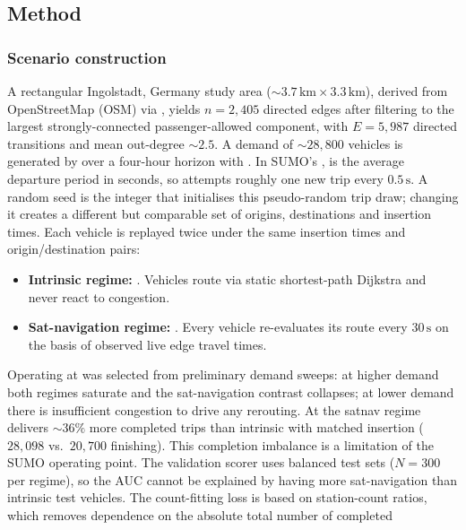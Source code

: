 \subsection{Method}

\subsubsection{Scenario construction}\label{sec:phase4-scenario}

A rectangular Ingolstadt, Germany study area
($\sim 3.7\,\text{km} \times 3.3\,\text{km}$), derived from
OpenStreetMap (OSM) via , yields $n = 2{,}405$ directed edges after filtering
to the largest strongly-connected passenger-allowed component, with
$E = 5{,}987$ directed transitions and mean out-degree $\sim 2.5$. A
demand of $\sim 28{,}800$ vehicles is generated by
 over a four-hour horizon with . In
SUMO's ,  is the average departure period in
seconds, so  attempts roughly one new trip every
$0.5\,\mathrm{s}$. A random seed is the integer that initialises this
pseudo-random trip draw; changing it creates a different but comparable
set of origins, destinations and insertion times. Each vehicle is replayed twice
under the same insertion times and origin/destination pairs:
\begin{itemize}
\item \textbf{Intrinsic regime:} .
Vehicles route via static shortest-path Dijkstra and never react to
congestion.
\item \textbf{Sat-navigation regime:} .
Every vehicle re-evaluates its route every $30\,\mathrm{s}$ on the basis
of observed live edge travel times.
\end{itemize}
Operating at  was selected from preliminary demand sweeps:
at higher demand both regimes saturate and
the sat-navigation contrast collapses; at lower demand there is
insufficient congestion to drive any rerouting. At  the
satnav regime delivers $\sim 36\%$ more completed trips than intrinsic
with matched insertion ($28{,}098$ vs.\ $20{,}700$ finishing). This
completion imbalance is a limitation of the SUMO operating point. The
validation scorer uses balanced test sets ($N=300$ per regime), so the
AUC cannot be explained by having more sat-navigation than intrinsic test
vehicles. The count-fitting loss is based on station-count ratios,
which removes dependence on the absolute total number of completed
